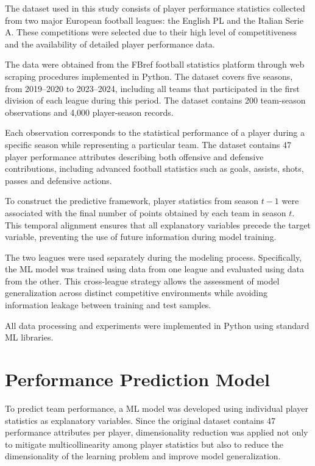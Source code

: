 \documentclass[a4paper,fleqn]{cas-sc}
\begin{document}
The dataset used in this study consists of player performance statistics collected from two major European football leagues: the English PL
and the Italian Serie A. These competitions were selected due to their high level of competitiveness and the availability of detailed player performance data.

The data were obtained from the FBref football statistics platform through web scraping procedures implemented in Python. The dataset covers five seasons, 
from 2019--2020 to 2023--2024, including all teams that participated in the first division of each league during this period. 
The dataset contains 200 team-season observations and 4,000 player-season records.

Each observation corresponds to the statistical performance of a player during a specific season while representing a particular team. The dataset contains 
47 player performance attributes describing both offensive and defensive contributions, including advanced football statistics such as goals, 
assists, shots, passes and defensive actions.

To construct the predictive framework, player statistics from season \(t-1\) were associated with the final number of points obtained by each team in
season \(t\). This temporal alignment ensures that all explanatory variables precede the target variable, preventing the use of future information during
model training.

The two leagues were used separately during the modeling process. Specifically, the ML model was trained using data from one league and evaluated
using data from the other. This cross-league strategy allows the assessment of model generalization across distinct competitive environments while avoiding
information leakage between training and test samples.

All data processing and experiments were implemented in Python using standard ML libraries.

\section{Performance Prediction Model}

To predict team performance, a ML model was developed using individual player statistics as explanatory variables. Since the original
dataset contains 47 performance attributes per player, dimensionality reduction was applied not only to mitigate multicollinearity among player 
statistics but also to reduce the dimensionality of the learning problem and improve model generalization.
\end{document}
